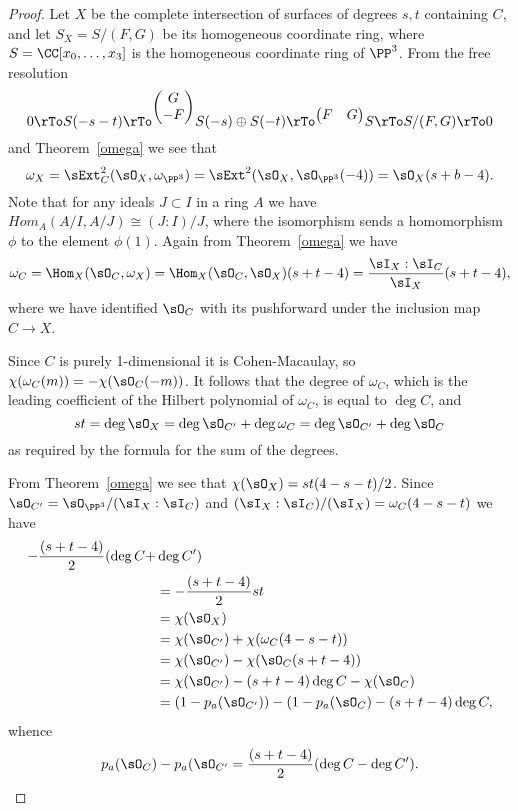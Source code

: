 \begin{proof}
 Let $X$ be the complete intersection of surfaces of degrees $s,t$ containing $C$, and let $S_X = S/(F,G)$ be its homogeneous coordinate ring, where
$S = \CC[x_0,\dots,x_3]$ is the homogeneous coordinate ring of $\PP^3$.
From the free resolution
$$
0\rTo S(-s-t) \rTo^{
\begin{pmatrix}
 G \\ -F
\end{pmatrix}}
 S(-s)\oplus S(-t) \rTo^{
\begin{pmatrix}
 F & G
\end{pmatrix}}
 S \rTo S/(F,G) \rTo 0
$$
 and Theorem~\ref{omega} we see that
 $$
\omega_X =  \sExt^2_C(\sO_X, \omega_{\PP^3}) =\sExt^2(\sO_X, \sO_{\PP^3}(-4)) = \sO_X(s+b-4).
 $$
Note that for any ideals $J\subset I$ in a ring $A$ we have $Hom_A(A/I, A/J) \cong (J:I)/J$, where the isomorphism
sends a homomorphism $\phi$ to the element $\phi(1)$. Again from Theorem~\ref{omega} we have 
$$
\omega_C = \Hom_X(\sO_C, \omega_X) = \Hom_X(\sO_C, \sO_X)(s+t-4) = \frac{\sI_X:\sI_C}{\sI_X}(s+t-4),
$$
where we have identified $\sO_C$ with its pushforward under the inclusion map $C\to X$. 

Since $C$ is purely 1-dimensional it is Cohen-Macaulay, so
$\chi(\omega_C(m)) = -\chi(\sO_C(-m))$. It follows that the degree of $\omega_C$, which is the leading coefficient of the Hilbert polynomial of $\omega_C$, is 
equal to $\deg C$, and 
$$
st = \deg \sO_X =\deg \sO_{C'}+\deg \omega_C = \deg \sO_{C'}+\deg \sO_C
$$
as required by the formula for the sum of the degrees.

From Theorem~\ref{omega} we see that $\chi(\sO_X) = st(4-s-t)/2$. Since $\sO_{C'} = \sO_{\PP^3}/(\sI_X : \sI_C)$ and
$(\sI_X : \sI_C)/(\sI_X) = \omega_C(4-s-t)$ we have
$$
\begin{aligned}
-\frac{(s+t-4)}{2} (\deg C +& \deg C') \\&= -\frac{(s+t-4)}{2}st \\
&= \chi(\sO_X) \\&=  \chi(\sO_{C'})+\chi(\omega_C(4-s-t)) \\&= \chi(\sO_{C'})-\chi(\sO_C(s+t-4)) \\&= \chi(\sO_{C'})-(s+t-4)\deg C-\chi(\sO_C)
\\&= (1-p_a(\sO_{C'})) - (1-p_a(\sO_C) -(s+t-4)\deg C,
\end{aligned}
$$
whence 
$$
p_a(\sO_C) -p_a(\sO_{C'} = \frac{(s+t-4)}{2} (\deg C - \deg C'). 
$$
 \end{proof}

